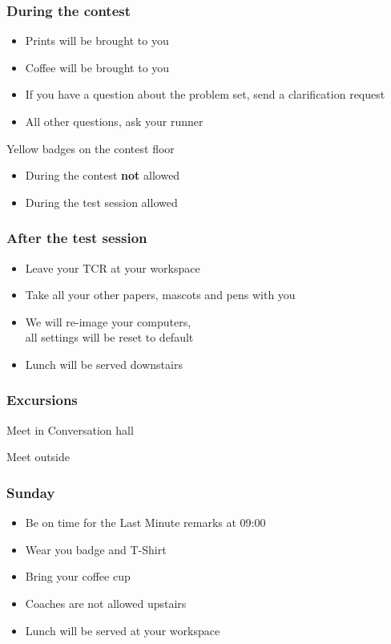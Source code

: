\documentclass[t]{beamer}
\begin{document}
\begin{frame}
	\frametitle{During the contest}
	\begin{itemize}
		\item Prints will be brought to you 
		\item Coffee will be brought to you 
		\item If you have a question about the problem set, send a clarification request
		\item All other questions, ask your runner
	\end{itemize}
	\begin{block}
		{Yellow badges on the contest floor}
		\begin{itemize}
			\item During the contest \textbf{not} allowed
			\item During the test session allowed
		\end{itemize}
	\end{block}
\end{frame}
\begin{frame}
	\frametitle{After the test session}
	\begin{itemize}
	\item Leave your TCR at your workspace
	\item Take all your other papers, mascots and pens with you
	\item We will re-image your computers,\\ all settings will be reset to default 
	\item Lunch will be served downstairs
	\end{itemize}
\end{frame}
\begin{frame}
	\frametitle{Excursions}
	\begin{description}[l]
		\item[Beertasting] Meet in Conversation hall
		\item[Guided City Tour] Meet outside 
	\end{description}
\end{frame}
\begin{frame}
	\frametitle{Sunday}
	\begin{itemize}
	\item Be on time for the Last Minute remarks at 09:00
	\item Wear you badge and T-Shirt
	\item Bring your coffee cup
	\item Coaches are not allowed upstairs
	\item Lunch will be served at your workspace
	\end{itemize}
\end{frame}
\end{document}
